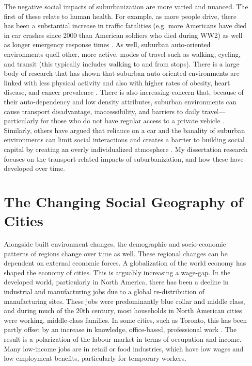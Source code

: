 The negative social impacts of suburbanization are more varied and nuanced. The first of these relate to human health. For example, as more people drive, there has been a substantial increase in traffic fatalities (e.g. more Americans have died in car crashes since 2000 than American soldiers who died during WW2) as well as longer emergency response times \cite{ewing_compactness_2015}. As well, suburban auto-oriented environments quell other, more active, modes of travel such as walking, cycling, and transit (this typically includes walking to and from stops). There is a large body of research that has shown that suburban auto-oriented environments are linked with less physical activity and also with higher rates of obesity, heart disease, and cancer prevalence \cite{ewing_compactness_2015,ewing_relationship_2003}. 
There is also increasing concern that, because of their auto-dependency and low density attributes, suburban environments can cause transport disadvantage, inaccessibility, and barriers to daily travel---particularly for those who do not have regular access to a private vehicle \cite{roorda_trip_2010,lucas_transport_2012,allen_planning_2020}. Similarly, others have argued that reliance on a car and the banality of suburban environments can limit social interactions and creates a barrier to building social capital by creating an overly individualized atmosphere \cite{jacobs_death_1961,kunstler_geography_1994}. My dissertation research focuses on the transport-related impacts of suburbanization, and how these have developed over time.






\section{The Changing Social Geography of Cities}

Alongside built environment changes, the demographic and socio-economic patterns of regions change over time as well. These regional changes can be dependent on external economic forces. A globalization of the world economy has shaped the economy of cities. This is arguably increasing a wage-gap. In the developed world, particularly in North America, there has been a decline in industrial and manufacturing jobs due to a global re-distribution of manufacturing sites. These jobs were predominantly blue collar and middle class, and during much of the 20th century, most households in North American cities were working, middle-class families. In some cities, such as Toronto, this has been partly offset by an increase in knowledge, office-based, professional work \cite{walks_social_2001}. The result is a polarization of the labour market in terms of occupation and income. Many low-income jobs are in retail or food industries, which have low wages and low employment benefits, particularly for temporary workers. 

